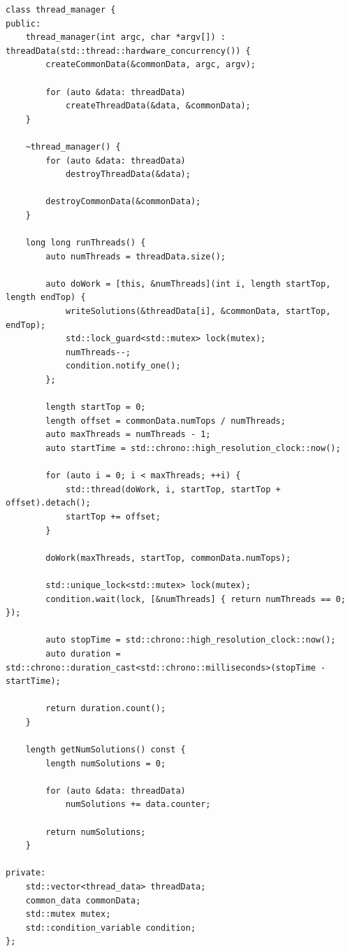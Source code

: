 \begin{lstlisting}[caption={A class to manage concurrency.},label={thread_manager}]
class thread_manager {
public:
    thread_manager(int argc, char *argv[]) : threadData(std::thread::hardware_concurrency()) {
        createCommonData(&commonData, argc, argv);

        for (auto &data: threadData)
            createThreadData(&data, &commonData);
    }

    ~thread_manager() {
        for (auto &data: threadData)
            destroyThreadData(&data);

        destroyCommonData(&commonData);
    }

    long long runThreads() {
        auto numThreads = threadData.size();

        auto doWork = [this, &numThreads](int i, length startTop, length endTop) {
            writeSolutions(&threadData[i], &commonData, startTop, endTop);
            std::lock_guard<std::mutex> lock(mutex);
            numThreads--;
            condition.notify_one();
        };

        length startTop = 0;
        length offset = commonData.numTops / numThreads;
        auto maxThreads = numThreads - 1;
        auto startTime = std::chrono::high_resolution_clock::now();

        for (auto i = 0; i < maxThreads; ++i) {
            std::thread(doWork, i, startTop, startTop + offset).detach();
            startTop += offset;
        }

        doWork(maxThreads, startTop, commonData.numTops);

        std::unique_lock<std::mutex> lock(mutex);
        condition.wait(lock, [&numThreads] { return numThreads == 0; });

        auto stopTime = std::chrono::high_resolution_clock::now();
        auto duration = std::chrono::duration_cast<std::chrono::milliseconds>(stopTime - startTime);

        return duration.count();
    }

    length getNumSolutions() const {
        length numSolutions = 0;

        for (auto &data: threadData)
            numSolutions += data.counter;

        return numSolutions;
    }

private:
    std::vector<thread_data> threadData;
    common_data commonData;
    std::mutex mutex;
    std::condition_variable condition;
};
\end{lstlisting}

